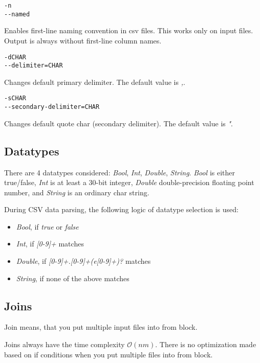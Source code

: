 \begin{verbatim}
-n
--named
\end{verbatim}
Enables first-line naming convention in csv files. This works only on input files. 
Output is always without first-line column names.

\begin{verbatim}
-dCHAR
--delimiter=CHAR
\end{verbatim}
Changes default primary delimiter. The default value is \textit{,}.

\begin{verbatim}
-sCHAR
--secondary-delimiter=CHAR
\end{verbatim}
Changes default quote char (secondary delimiter). The default value is \textit{"}.

\subsection{Datatypes}
There are 4 datatypes considered: \textit{Bool}, \textit{Int}, \textit{Double}, \textit{String}. 
\textit{Bool} is either true/false, \textit{Int} is at least a 30-bit integer, \textit{Double} double-precision floating point number, and \textit{String} is an ordinary char string.

During CSV data parsing, the following logic of datatype selection is used:
\begin{itemize}
    \item \textit{Bool}, if \textit{true} or \textit{false}
    \item \textit{Int}, if \textit{[0-9]+} matches
    \item \textit{Double}, if \textit{[0-9]+.[0-9]+(e[0-9]+)?} matches
    \item \textit{String}, if none of the above matches
\end{itemize}

\subsection{Joins}
Join means, that you put multiple input files into from block.

Joins always have the time complexity $\mathcal{O}(nm)$. There is no optimization made based on if conditions when you put multiple files into from block.

